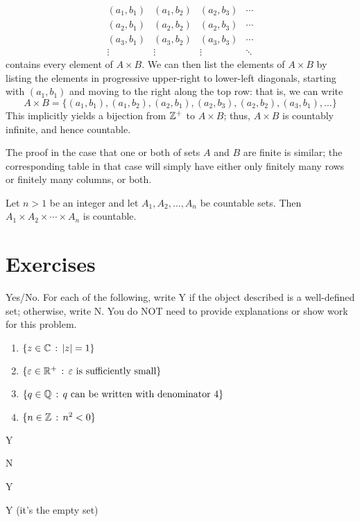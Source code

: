 $$
    \begin{array}{cccc}
      (a_1,b_1) & (a_1,b_2) & (a_2,b_3) & \cdots \\
      (a_2,b_1) & (a_2,b_2) & (a_2,b_3) & \cdots \\
      (a_3,b_1) & (a_3,b_2) & (a_3,b_3) & \cdots\\
      \vdots & \vdots & \vdots &  \ddots
    \end{array}$$ contains every element of $A\times B$. We can then list the elements of $A\times B$ by listing the elements in progressive upper-right to lower-left diagonals, starting with $(a_1,b_1)$ and moving to the right along the top row: that is, we can write
   $$A\times B=\{(a_1,b_1),(a_1,b_2),(a_2,b_1),(a_2,b_3),(a_2,b_2),(a_3,b_1),\ldots\}$$
    This implicitly yields a bijection from $\mathbb{Z}^+$ to $A\times B$; thus, $A\times B$ is countably infinite, and hence countable.

    The proof in the case that one or both of sets $A$ and $B$ are finite is similar; the corresponding table in that case will simply have either only finitely many rows or finitely many columns, or both.

\begin{cor} Let $n>1$ be an integer and let $A_1,A_2,\ldots, A_n$ be countable sets.  Then $A_1\times A_2\times \cdots \times A_n$ is countable.
\end{cor}


\pagebreak

\section{Exercises}

\begin{exercise}[ID=1A]

Yes/No. For each of the following, write Y if the object described is a well-defined set; otherwise, write N. You do NOT need to provide explanations or show work for this problem.

\begin{enumerate}

\item $\{z \in \mathbb{C} \,:\, |z|=1\}$

\item $\{\varepsilon \in \mathbb{R}^+\,:\, \varepsilon \mbox{ is sufficiently small}\}$

\item $\{q\in \mathbb{Q} \,:\, q \mbox{ can be written  with denominator }4\}$

\item $\{n \in \mathbb{Z}\,:\, n^2 <0\}$

\end{enumerate}

\end{exercise}
\begin{solution}[print=false]
\begin{inparaenum}[(a)]
\item Y \hfill \item N \hfill \item  Y \hfill \item Y (it's the empty set)
\end{inparaenum}
\end{solution}

